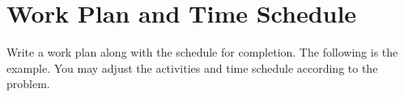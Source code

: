 \documentclass{ittelkom}
\begin{document}



\section{Work Plan and Time Schedule}
Write a work plan along with the schedule for completion. The following is the
example. You may adjust the activities and time schedule according to the
problem. \newline
\end{document}
